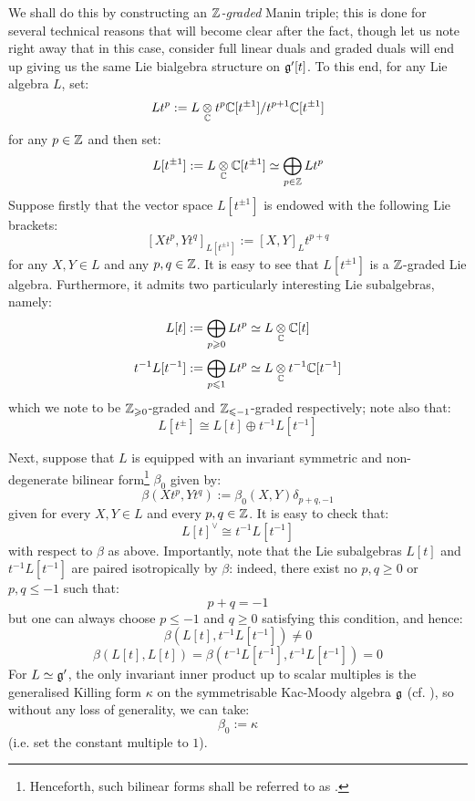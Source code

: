             We shall do this by constructing an \textit{$\mathbb{Z}$-graded} Manin triple; this is done for several technical reasons that will become clear after the fact, though let us note right away that in this case, consider full linear duals and graded duals will end up giving us the same Lie bialgebra structure on $\mathfrak{g}'[t]$. To this end, for any Lie algebra $L$, set:
                $$L t^p := L \tensor_{\bbC} t^p\bbC[t^{\pm 1}]/t^{p + 1}\bbC[t^{\pm 1}]$$
            for any $p \in \mathbb{Z}$ and then set:
                $$L[t^{\pm 1}] := L \tensor_{\bbC} \bbC[t^{\pm 1}] \cong \bigoplus_{p \in \Z} L t^p$$
            Suppose firstly that the vector space $L[t^{\pm 1}]$ is endowed with the following Lie brackets:
                $$[X t^p, Y t^q]_{L[t^{\pm 1}]} := [X, Y]_{L} t^{p + q}$$
            for any $X, Y \in L$ and any $p, q \in \mathbb{Z}$. It is easy to see that $L[t^{\pm 1}]$ is a $\mathbb{Z}$-graded Lie algebra. Furthermore, it admits two particularly interesting Lie subalgebras, namely:
                $$L[t] := \bigoplus_{p \geq 0} L t^p \cong L \tensor_{\bbC} \bbC[t]$$
                $$t^{-1}L[t^{-1}] := \bigoplus_{p \leq 1} L t^p \cong L \tensor_{\bbC} t^{-1}\bbC[t^{-1}]$$
            which we note to be $\mathbb{Z}_{\geqslant 0}$-graded and $\mathbb{Z}_{\leqslant -1}$-graded respectively; note also that:
                $$L[t^{\pm}] \cong L[t] \oplus t^{-1} L[t^{-1}]$$
            
            Next, suppose that $L$ is equipped with an invariant symmetric and non-degenerate bilinear form\footnote{Henceforth, such bilinear forms shall be referred to as .} $\beta_0$ given by:
                $$\beta(X t^p, Y t^q) := \beta_0(X, Y) \delta_{p + q, -1}$$
            given for every $X, Y \in L$ and every $p, q \in \mathbb{Z}$. It is easy to check that:
                $$L[t]^{\vee} \cong t^{-1}L[t^{-1}]$$
            with respect to $\beta$ as above. Importantly, note that the Lie subalgebras $L[t]$ and $t^{-1}L[t^{-1}]$ are paired isotropically by $\beta$: indeed, there exist no $p, q \geq 0$ or $p, q \leq -1$ such that:
                $$p + q = -1$$
            but one can always choose $p \leq -1$ and $q \geq 0$ satisfying this condition, and hence:
                $$\beta(L[t], t^{-1}L[t^{-1}]) \not = 0$$
                $$\beta(L[t], L[t]) = \beta(t^{-1}L[t^{-1}], t^{-1}L[t^{-1}]) = 0$$
            For $L \simeq \mathfrak{g}'$, the only invariant inner product up to scalar multiples is the generalised Killing form $\kappa$ on the symmetrisable Kac-Moody algebra $\mathfrak{g}$ (cf. \cite[Chapter 2]{kac_infinite_dimensional_lie_algebras}), so without any loss of generality, we can take:
                $$\beta_0 := \kappa$$
            (i.e. set the constant multiple to $1$). 


